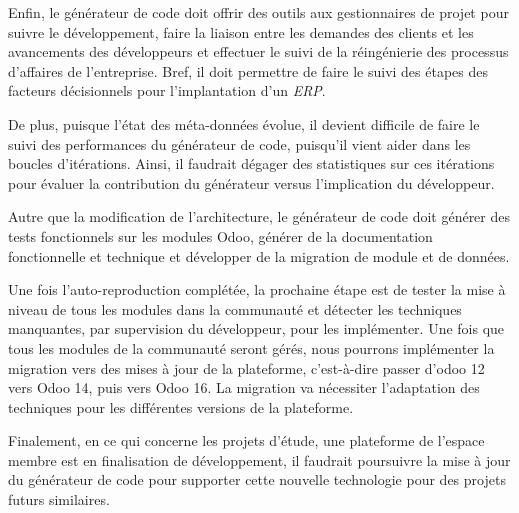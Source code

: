 Enfin, le générateur de code doit offrir des outils aux gestionnaires de projet pour suivre le développement, faire la liaison entre les demandes des clients et les avancements des développeurs et effectuer le suivi de la réingénierie des processus d'affaires de l'entreprise. Bref, il doit permettre de faire le suivi des étapes des facteurs décisionnels pour l'implantation d'un \textit{ERP}.

De plus, puisque l’état des méta-données évolue, il devient difficile de faire le suivi des performances du générateur de code, puisqu’il vient aider dans les boucles d’itérations. Ainsi, il faudrait dégager des statistiques sur ces itérations pour évaluer la contribution du générateur versus l'implication du développeur.




Autre que la modification de l'architecture, le générateur de code doit générer des tests fonctionnels sur les modules Odoo, générer de la documentation fonctionnelle et technique et développer de la migration de module et de données.


Une fois l'auto-reproduction complétée, la prochaine étape est de tester la mise à niveau de tous les modules dans la communauté et détecter les techniques manquantes, par supervision du développeur, pour les implémenter. Une fois que tous les modules de la communauté seront gérés, nous pourrons implémenter la migration vers des mises à jour de la plateforme, c’est-à-dire passer d'odoo 12 vers Odoo 14, puis vers Odoo 16. La migration va nécessiter l'adaptation des techniques pour les différentes versions de la plateforme.




Finalement, en ce qui concerne les projets d'étude, une plateforme de l'espace membre est en finalisation de développement, il faudrait poursuivre la mise à jour du générateur de code pour supporter cette nouvelle technologie pour des projets futurs similaires.




